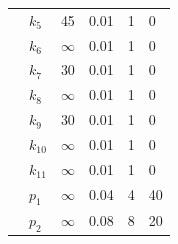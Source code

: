 \documentclass[11pt]{article}
\begin{document}
\begin{table}[htbp]
{\begin{tabular}{llllll}
                & $k_5$  & 45  & 0.01 & 1  & 0  \\
                & $k_6$  & $\infty$ & 0.01 & 1  & 0  \\
                & $k_7$  & 30  & 0.01 & 1  & 0  \\
                & $k_8$  & $\infty$ & 0.01 & 1  & 0  \\
                & $k_9$  & 30  & 0.01 & 1  & 0  \\
                & $k_{10}$ & $\infty$ & 0.01 & 1  & 0  \\
                & $k_{11}$ & $\infty$ & 0.01 & 1  & 0  \\
                & $p_1$  & $\infty$ & 0.04 & 4  & 40 \\
                & $p_2$  & $\infty$ & 0.08 & 8  & 20 \\
        \bottomrule
    \end{tabular}
}
\end{table}
\end{document}
